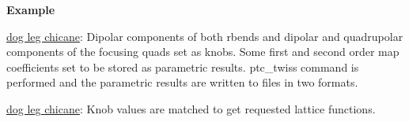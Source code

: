 {\bf Example}

\href{http://cern.ch/frs/mad-X_examples/ptc_madx_interface/knobs/knobs.madx}{dog
  leg chicane}: Dipolar components of both rbends and dipolar and
quadrupolar components of the focusing quads set as knobs. Some first
and second order map coefficients set to be stored as parametric
results. ptc\_twiss command is performed and the parametric results are
written to files in two formats. 

\href{http://cern.ch/frs/mad-X_examples/ptc_madx_interface/matchknobs/matchknobs.madx}{dog
  leg chicane}: Knob values are matched to get requested lattice
functions.  


 
% 
